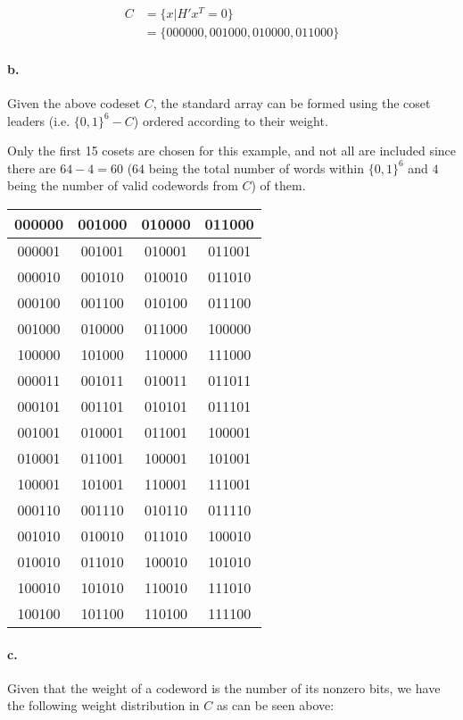 \documentclass{article}
\begin{document}
\begin{align*}
  C&=\{x|H'x^T=0\}\\
   &=\{000000, 001000, 010000, 011000\}
\end{align*}

\paragraph{b.} Given the above codeset $C$, the standard array can be formed
using the coset leaders (i.e. $\{0,1\}^6-C$) ordered according to their weight.

Only the first 15 cosets are chosen for this example, and not all are included
since there are $64-4=60$ ($64$ being the total number of words within $\{0,1\}^6$
and $4$ being the number of valid codewords from $C$) of them.

\begin{center}
  \begin{tabular}{c|c c c}
    000000 & 001000 & 010000 & 011000 \\
    \hline
    000001 & 001001 & 010001 & 011001 \\
    000010 & 001010 & 010010 & 011010 \\
    000100 & 001100 & 010100 & 011100 \\
    001000 & 010000 & 011000 & 100000 \\
    100000 & 101000 & 110000 & 111000 \\
    000011 & 001011 & 010011 & 011011 \\
    000101 & 001101 & 010101 & 011101 \\
    001001 & 010001 & 011001 & 100001 \\
    010001 & 011001 & 100001 & 101001 \\
    100001 & 101001 & 110001 & 111001 \\
    000110 & 001110 & 010110 & 011110 \\
    001010 & 010010 & 011010 & 100010 \\
    010010 & 011010 & 100010 & 101010 \\
    100010 & 101010 & 110010 & 111010 \\
    100100 & 101100 & 110100 & 111100 \\
  \end{tabular}
\end{center}

\paragraph{c.} Given that the weight of a codeword is the number of its nonzero
bits, we have the following weight distribution in $C$ as can be seen above:
\end{document}
